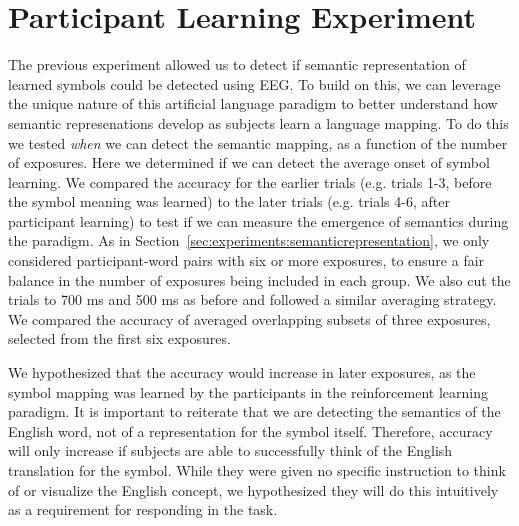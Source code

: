 \section{Participant Learning Experiment}
\label{sec:experiments:participantlearning}
The previous experiment allowed us to detect if semantic representation of 
learned symbols could be detected using EEG. To build on this, we can leverage 
the unique nature of this artificial language paradigm to better understand how 
semantic represenations develop as subjects learn a language mapping. To do 
this we tested \emph{when} we can detect the semantic mapping, as a function of 
the number of exposures.  Here we determined if we can detect the average onset 
of symbol learning. We compared the \tvt accuracy for the earlier trials (e.g.  
trials 1-3, before the symbol meaning was learned) to the later trials (e.g.  
trials 4-6, after participant learning) to test if we can measure the emergence 
of semantics during the paradigm. As in 
Section~\ref{sec:experiments:semanticrepresentation}, we only considered 
participant-word pairs with six or more exposures, to ensure a fair balance in 
the number of exposures being included in each group. We also cut the trials to 
700 ms and 500 ms as before and followed a similar averaging strategy. We 
compared the \tvt accuracy of averaged overlapping subsets of three exposures, 
selected from the first six exposures.

We hypothesized that the \tvt accuracy would increase in later exposures, as 
the symbol mapping was learned by the participants in the reinforcement 
learning paradigm. It is important to reiterate that we are detecting the 
semantics of the English word, not of a representation for the symbol itself.  
Therefore, accuracy will only increase if subjects are able to successfully 
think of the English translation for the symbol. While they were given no 
specific instruction to think of or visualize the English concept, we 
hypothesized they will do this intuitively as a requirement for responding in 
the task.
